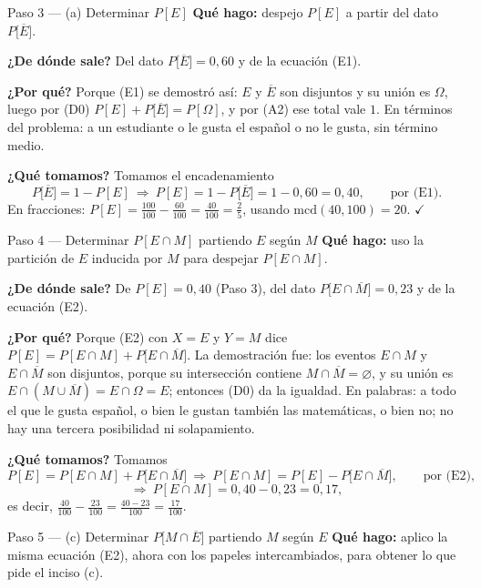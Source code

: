 \documentclass[11pt]{article}
\begin{document}
\begin{sol}
\begin{paso}{Paso 3 --- (a) Determinar $P[E]$}
\textbf{Qué hago:} despejo $P[E]$ a partir del dato $P\big[\overline{E}\big]$.

\textbf{¿De dónde sale?} Del dato $P\big[\overline{E}\big]=0{,}60$ y de la ecuación (E1).

\textbf{¿Por qué?} Porque (E1) se demostró así: $E$ y $\overline{E}$ son disjuntos y su unión es
$\Omega$, luego por (D0) $P[E]+P\big[\overline{E}\big]=P[\Omega]$, y por (A2) ese total vale
$1$. En términos del problema: a un estudiante o le gusta el español o no le gusta, sin término
medio.

\textbf{¿Qué tomamos?} Tomamos el encadenamiento
\[
P\big[\overline{E}\big]=1-P[E]
\ \Longrightarrow\ P[E]=1-P\big[\overline{E}\big]
=1-0{,}60=0{,}40 , \qquad\text{por (E1)} .
\]
En fracciones: $P[E]=\frac{100}{100}-\frac{60}{100}=\frac{40}{100}=\frac{2}{5}$, usando
$\mathrm{mcd}(40,100)=20$. $\checkmark$
\end{paso}

\begin{paso}{Paso 4 --- Determinar $P[E\cap M]$ partiendo $E$ según $M$}
\textbf{Qué hago:} uso la partición de $E$ inducida por $M$ para despejar $P[E\cap M]$.

\textbf{¿De dónde sale?} De $P[E]=0{,}40$ (Paso 3), del dato $P\big[E\cap\overline{M}\big]=0{,}23$
y de la ecuación (E2).

\textbf{¿Por qué?} Porque (E2) con $X=E$ y $Y=M$ dice
$P[E]=P[E\cap M]+P\big[E\cap\overline{M}\big]$. La demostración fue: los eventos $E\cap M$ y
$E\cap\overline{M}$ son disjuntos, porque su intersección contiene $M\cap\overline{M}=\varnothing$,
y su unión es $E\cap(M\cup\overline{M})=E\cap\Omega=E$; entonces (D0) da la igualdad. En
palabras: a todo el que le gusta español, o bien le gustan también las matemáticas, o bien no;
no hay una tercera posibilidad ni solapamiento.

\textbf{¿Qué tomamos?} Tomamos
\[
P[E]=P[E\cap M]+P\big[E\cap\overline{M}\big]
\ \Longrightarrow\ P[E\cap M]=P[E]-P\big[E\cap\overline{M}\big] , \qquad\text{por (E2),}
\]
\[
\Longrightarrow\ P[E\cap M]=0{,}40-0{,}23=0{,}17 ,
\]
es decir, $\frac{40}{100}-\frac{23}{100}=\frac{40-23}{100}=\frac{17}{100}$.
\end{paso}

\begin{paso}{Paso 5 --- (c) Determinar $P\big[M\cap\overline{E}\big]$ partiendo $M$ según $E$}
\textbf{Qué hago:} aplico la misma ecuación (E2), ahora con los papeles intercambiados, para
obtener lo que pide el inciso (c).


\end{paso}
\end{sol}
\end{document}
